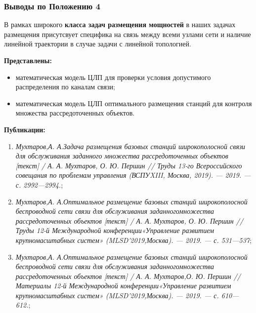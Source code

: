 \begin{frame}
    \frametitle{Выводы по Положению 4}
    \fontsize{8pt}{7.2}\selectfont

    В рамках широкого \textbf{класса задач размещения мощностей} в наших задачах размещения присутсвует специфика на связь между всеми узлами сети и наличие линейной траектории в случае задачи с линейной топологией. 
    \bigskip

    \textbf{Представлены:}
    \begin{itemize}
        \item математическая модель ЦЛП для проверки условия допустимого распределения по каналам связи;
        \item математическая модель ЦЛП оптимального размещения станций для контроля множества рассредоточенных объектов.
    \end{itemize}

    \bigskip
    \textbf{Публикации:}
    \begin{minipage}[c]{1\linewidth}
        \fontsize{6pt}{7.2}\selectfont
        \begin{enumerate}
            \item \textit{Мухтаров,А. А.Задача размещения базовых станций широкопо­лосной связи для обслуживания заданного множества рассредото­ченных объектов [текст] / А. А. Мухтаров, О. Ю. Першин // Труды 13-го Всероссийского совещания по проблемам управления (ВСПУXIII, Москва, 2019). — 2019. — с. 2992—2994.};
            
            \item \textit{Мухтаров,А. А.Оптимальное размещение базовых станций широ­кополосной беспроводной сети связи для обслуживания заданногомножества рассредоточенных объектов [текст] / А. А. Мухта­ров, О. Ю. Першин // Труды 12-й Международной конференции«Управление развитием крупномасштабных систем» (MLSD’2019,Москва). — 2019. — с. 531—537};
            
            \item \textit{Мухтаров,А. А.Оптимальное размещение базовых станций широ­кополосной беспроводной сети связи для обслуживания заданногомножества рассредоточенных объектов [текст] / А. А. Мухтаров,О. Ю. Першин // Материалы 12-й Международной конференции«Управление развитием крупномасштабных систем» (MLSD’2019,Москва). — 2019. — с. 610—612.};
            
        \end{enumerate}
    \end{minipage}

\end{frame}


